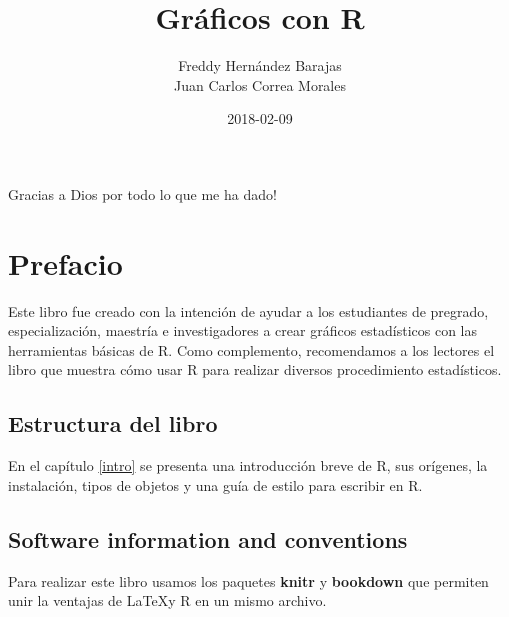 \documentclass[10pt,]{krantz}
\title{Gráficos con R}
\author{Freddy Hernández Barajas\\
Juan Carlos Correa Morales}
\date{2018-02-09}
\let\proglang=\textsf
\begin{document}
\maketitle


\thispagestyle{empty}

\begin{center}


Gracias a Dios por todo lo que me ha dado!

\end{center}

\setlength{\abovedisplayskip}{-5pt}
\setlength{\abovedisplayshortskip}{-5pt}

{
\hypersetup{linkcolor=black}
\setcounter{tocdepth}{2}
\tableofcontents
}
\listoftables
\listoffigures
\chapter*{Prefacio}\label{prefacio}


Este libro fue creado con la intención de ayudar a los estudiantes de
pregrado, especialización, maestría e investigadores a crear gráficos
estadísticos con las herramientas básicas de \proglang{R}. Como
complemento, recomendamos a los lectores el libro
\citet{hernandez_usuga} que muestra cómo usar \proglang{R} para realizar
diversos procedimiento estadísticos.

\section*{Estructura del libro}\label{estructura-del-libro}


En el capítulo \ref{intro} se presenta una introducción breve de
\proglang{R}, sus orígenes, la instalación, tipos de objetos y una guía
de estilo para escribir en \proglang{R}.

\section*{Software information and
conventions}\label{software-information-and-conventions}


Para realizar este libro usamos los paquetes \textbf{knitr}
\citep{xie2015} y \textbf{bookdown} \citep{R-bookdown}
que permiten unir la ventajas de \LaTeX y \proglang{R} en un mismo
archivo.
\end{document}
